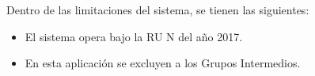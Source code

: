 Dentro de las limitaciones del sistema, se tienen las siguientes:

\begin{itemize}
    \item El sistema opera bajo la RU N del año 2017.
    
    \item En esta aplicación se excluyen a los Grupos Intermedios.
\end{itemize}